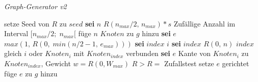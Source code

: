 \documentclass[12pt]{article}
\begin{document}
\renewcommand{\algorithmicrequire}{\textbf{geg.:}}
\renewcommand{\algorithmicensure}{\textbf{ges.:}}
\renewcommand{\algorithmicprocedure}{\textbf{prozedur}}
\renewcommand{\algorithmicfor}{\textbf{für}}
\renewcommand{\algorithmicdo}{\textbf{wiederhole}}
\renewcommand{\algorithmicend}{\textbf{ende}}
\renewcommand{\algorithmicrepeat}{\textbf{wiederhole}}
\renewcommand{\algorithmicif}{\textbf{wenn}}
\renewcommand{\algorithmicthen}{\textbf{dann}}
\renewcommand{\algorithmicuntil}{\textbf{solange}} %
\newcommand{\sei}{\textbf{sei }}

\begin{algorithm}
\caption{\textit{Graph-Generator v2} \label{alg:generatorv2}}
\begin{algorithmic}[1]
\Statex
{}
\Statex
{}
	\State setze Seed von $R$ zu $seed$
	\State \sei $n$ $R(n_{max}/2,\,n_{max}) * s$ \Comment Zufällige Anzahl im Interval $\big[n_{max}/2;\;n_{max}\big[$
	\State füge $n$ $Knoten$ zu $g$ hinzu
		\State \sei $e$ $max(1,\,R(0,\;min(n/2-1,\,e_{max})))$
			\State \sei $index$ $i$
			\Repeat 
			\State \sei $index$ $R(0,\,n)$
			\Until $index$ gleich $i$ oder $Knoten_{i}$ mit $Knoten_{index}$ verbunden
			\State \sei $e$ Kante von $Knoten_{i}$ zu $Knoten_{index}$, Gewicht $w = R(0, W_{max})$
			 \State \Comment $R>R =$ Zufallstest
				\State setze $e$ gerichtet
			\EndIf
			\State füge $e$ zu $g$ hinzu
		\EndFor
	\EndFor
\EndProcedure
\end{algorithmic}
\end{algorithm}

\clearpage
\end{document}
